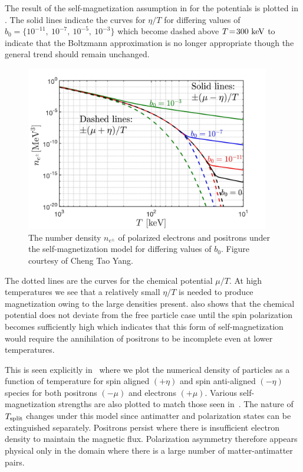 The result of the self-magnetization assumption in  for the potentials is plotted in . The solid lines indicate the curves for $\eta/T$ for differing values of $b_{0}=\{10^{-11},\ 10^{-7},\ 10^{-5},\ 10^{-3}\}$ which become dashed above $T\!=\!300\text{ keV}$ to indicate that the Boltzmann approximation is no longer appropriate though the general trend should remain unchanged.

\begin{figure}[h]
 \centering
 \includegraphics[width=0.95\textwidth]{plots/chap04cosmo/ElectronDensity_SpinChemicalPotential004.jpg}
 \caption{The number density $n_{e^{\pm}}$ of polarized electrons and positrons under the self-magnetization model for differing values of $b_{0}$. Figure courtesy of Cheng Tao Yang.}
 \label{fig:polarswap} 
\end{figure}

The dotted lines are the curves for the chemical potential $\mu/T$. At high temperatures we see that a relatively small $\eta/T$ is needed to produce magnetization owing to the large densities present.  also shows that the chemical potential does not deviate from the free particle case until the spin polarization becomes sufficiently high which indicates that this form of self-magnetization would require the annihilation of positrons to be incomplete even at lower temperatures.

This is seen explicitly in~ where we plot the numerical density of particles as a function of temperature for spin aligned $(+\eta)$ and spin anti-aligned $(-\eta)$ species for both positrons $(-\mu)$ and electrons $(+\mu)$. Various self-magnetization strengths are also plotted to match those seen in~. The nature of $T_{\rm split}$ changes under this model since antimatter and polarization states can be extinguished separately. Positrons persist where there is insufficient electron density to maintain the magnetic flux. Polarization asymmetry therefore appears physical only in the domain where there is a large number of matter-antimatter pairs.

